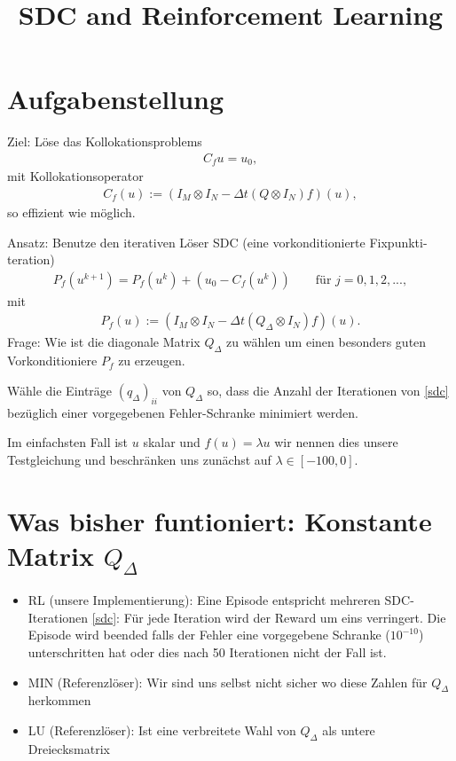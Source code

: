 \documentclass[]{article}
\newcommand{\dt}{\Delta t}
\begin{document}
\title{SDC and Reinforcement Learning}
\maketitle

\section{Aufgabenstellung}

Ziel: Löse das Kollokationsproblems
\begin{align}
C_f u = u_0 ,
\end{align}
mit Kollokationsoperator
\begin{align}
C_f (u) := (I_M \otimes I_N - \dt (Q \otimes I_N )f ) (u),
\end{align}
so effizient wie möglich.

Ansatz: Benutze den iterativen Löser SDC (eine vorkonditionierte Fixpunkti-
teration)
\begin{align}\label{sdc}
P_f(u^{k+1}) = P_f(u^k) + (u_0 - C_f (u^k )) \qquad \text{für } j = 0, 1, 2, . . . ,
\end{align}
mit
\begin{align}
P_f (u) := (I_M \otimes I_N - \dt (Q_\Delta \otimes I_N )f ) (u).
\end{align}
Frage: Wie ist die diagonale Matrix $Q_\Delta$ zu wählen um einen besonders guten
Vorkonditioniere $P_f$ zu erzeugen.

Wähle die Einträge $(q_\Delta)_{ii}$ von $Q_\Delta$ so, dass die Anzahl der Iterationen
von \eqref{sdc} bezüglich einer vorgegebenen Fehler-Schranke minimiert werden.


Im einfachsten Fall ist $u$ skalar und $f (u) = \lambda u$ wir nennen dies unsere Testgleichung und beschränken uns zunächst auf $\lambda \in [-100,0]$.





\section{Was bisher funtioniert: Konstante Matrix $Q_\Delta$}

\begin{itemize}
\item RL (unsere Implementierung): Eine Episode entspricht mehreren SDC-Iterationen \eqref{sdc}:
Für jede Iteration wird der Reward um eins verringert. Die Episode wird beended falls der Fehler eine vorgegebene Schranke ($10^{-10}$) unterschritten hat oder dies nach 50 Iterationen nicht der Fall ist. 	
\item MIN (Referenzlöser): Wir sind uns selbst nicht sicher wo diese Zahlen für $Q_\Delta$ herkommen
\item LU (Referenzlöser): Ist eine verbreitete Wahl von $Q_\Delta$ als untere Dreiecksmatrix
\end{itemize}
\end{document}
